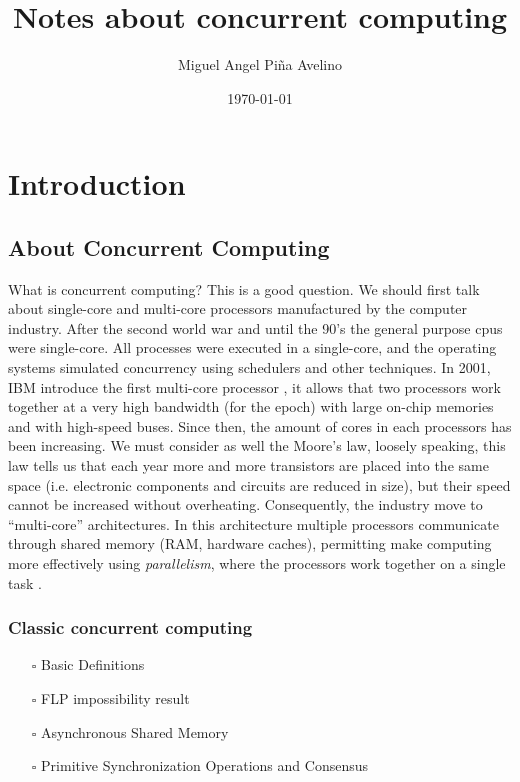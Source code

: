 \documentclass[openany, a4paper]{book}
\author{Miguel Angel Piña Avelino}
\date{\today}
\title{Notes about concurrent computing}
\theoremstyle{break}
\theoremstyle{example}
\theoremstyle{note}
\theoremstyle{break}
\theoremstyle{exercise}
\begin{document}
\maketitle
\tableofcontents


\part{Introduction}
\label{sec:orgd305580}

\chapter{About Concurrent Computing}
\label{sec:orgee17818}

What is concurrent computing? This is a good question. We should first talk
about single-core and multi-core processors manufactured by the computer
industry. After the second world war and until the 90's the general purpose
cpus were single-core. All processes were executed in a single-core, and the
operating systems simulated concurrency using schedulers and other
techniques. In 2001, IBM introduce the first multi-core processor
\cite{ibmIBM100Power}, it allows that two processors work together at a very
high bandwidth (for the epoch) with large on-chip memories and with
high-speed buses. Since then, the amount of cores in each processors has been
increasing. We must consider as well the Moore's law, loosely speaking, this
law tells us that each year more and more transistors are placed into the
same space (i.e. electronic components and circuits are reduced in size), but
their speed cannot be increased without overheating. Consequently, the
industry move to ``multi-core'' architectures. In this architecture multiple
processors communicate through shared memory (RAM, hardware caches),
permitting make computing more effectively using \emph{parallelism}, where the
processors work together on a single task \cite{DBLP_books_daglib_0020056}.

\section{Classic concurrent computing}
\label{sec:org3566e0e}

\begin{itemize}
\item[{$\square$}] Basic Definitions
\item[{$\square$}] FLP impossibility result
\item[{$\square$}] Asynchronous Shared Memory
\item[{$\square$}] Primitive Synchronization Operations and Consensus
\end{itemize}
\end{document}
